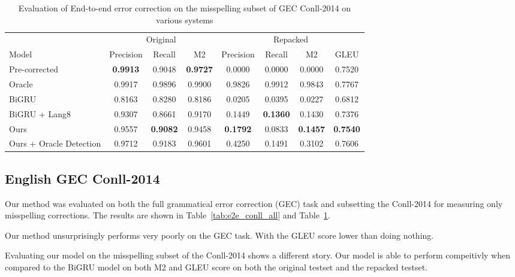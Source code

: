 \begin{table}
\caption{Evaluation of End-to-end error correction on the misspelling subset of GEC Conll-2014 on various systems}
  \label{tab:e2e_conll_misspell}
  \begin{tabular}{lccccccc}
    \toprule
    & \multicolumn{3}{c}{Original} & \multicolumn{4}{c}{Repacked}\\
    Model & Precision & Recall & M2 & Precision & Recall & M2 & GLEU\\
    \midrule
    Pre-corrected & \textbf{0.9913} & 0.9048 & \textbf{0.9727} & 0.0000 & 0.0000 & 0.0000 & 0.7520 \\
    Oracle & 0.9917 & 0.9896 & 0.9900 & 0.9826 & 0.9912 & 0.9843 & 0.7767 \\
    \midrule
    BiGRU & 0.8163 & 0.8280 & 0.8186 & 0.0205 & 0.0395 & 0.0227 & 0.6812 \\
    BiGRU + Lang8 & 0.9307 & 0.8661 & 0.9170 & 0.1449 & \textbf{0.1360} & 0.1430 & 0.7376 \\
    \midrule
    Ours & 0.9557 & \textbf{0.9082} & 0.9458 & \textbf{0.1792} & 0.0833 & \textbf{0.1457} & \textbf{0.7540} \\
    Ours + Oracle Detection & 0.9712 & 0.9183 & 0.9601 & 0.4250 & 0.1491 & 0.3102 & 0.7606 \\
    \bottomrule
\end{tabular}
\end{table}

\subsection{English GEC Conll-2014}

Our method was evaluated on both the full grammatical error correction (GEC) task and subsetting the Conll-2014 for measuring only misspelling corrections. The results are shown in Table~\ref{tab:e2e_conll_all} and Table~\ref{tab:e2e_conll_misspell}.

Our method unsurprisingly performs very poorly on the GEC task. With the GLEU score lower than doing nothing.

Evaluating our model on the misspelling subset of the Conll-2014 shows a different story. Our model is able to perform compeitivly when compared to the BiGRU model on both M2 and GLEU score on both the original testset and the repacked testset.